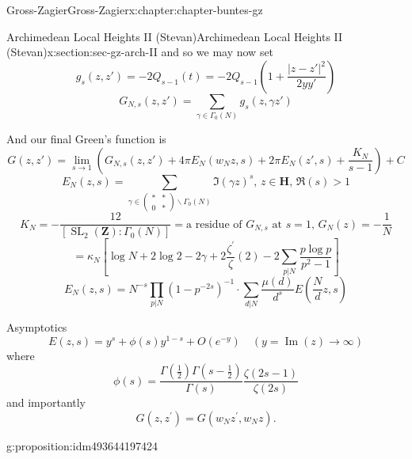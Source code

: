 \documentclass[oneside,10pt,]{book}
\numberwithin{equation}{section}
\newcommand{\lb}{[}
\newcommand{\rb}{]}
\newcommand{\ZZ}{\mathbf{Z}}
\newcommand{\HH}{\mathbf{H}}
\DeclareMathOperator{\SL}{SL}
\newcommand{\gt}{>}
\newcommand{\amp}{&}
\begin{document}
\begin{chapterptx}{Gross-Zagier}{}{Gross-Zagier}{}{}{x:chapter:chapter-buntes-gz}
\begin{sectionptx}{Archimedean Local Heights II (Stevan)}{}{Archimedean Local Heights II (Stevan)}{}{}{x:section:sec-gz-arch-II}
and so we may now set%
\begin{equation*}
g_s(z,z') = -2Q_{s-1}(t) = -2 Q_{s-1}\left(1+ \frac{|z-z'|^2}{2yy'}\right)
\end{equation*}
%
\begin{equation*}
G_{N,s}(z,z') = \sum_{\gamma \in \Gamma _0(N)} g_s(z,\gamma z')
\end{equation*}
%
\par
And our final Green's function is%
\begin{equation*}
G(z,z') = \lim_{s\to 1} (G_{N,s}(z,z') + 4\pi  E_N(w_N z,s) + 2\pi  E_N(z', s)+\frac{K_N}{s-1}) +C
\end{equation*}
%
\begin{equation*}
E_N(z,s) = \sum_{\gamma \in \begin{pmatrix}\ast\amp\ast\\0\amp\ast\end{pmatrix}\backslash \Gamma _0(N)} \Im(\gamma z)^s,\,z\in \HH,\,\Re(s) \gt 1
\end{equation*}
%
\begin{equation*}
K_N = -\frac{12}{\lb \SL_2(\ZZ) : \Gamma _0(N)\rb } = \text{a residue of }G_{N,s} \text{ at } s=1,\,G_N(z) = -\frac{1}{N}
\end{equation*}
%
\begin{equation*}
=\kappa_{N}\left[\log N+2 \log 2-2 \gamma+2 \frac{\zeta^{\prime}}{\zeta}(2)-2 \sum_{p | N} \frac{p \log p}{p^{2}-1}\right]
\end{equation*}
%
\begin{equation*}
E_{N}(z, s)=N^{-s} \prod_{p | N}\left(1-p^{-2 s}\right)^{-1} \cdot \sum_{d | N} \frac{\mu(d)}{d^{s}} E\left(\frac{N}{d} z, s\right)
\end{equation*}
%
\par
Asymptotics%
\begin{equation*}
E(z, s)=y^{s}+\phi(s) y^{1-s}+O\left(e^{-y}\right) \quad(y=\operatorname{Im}(z) \rightarrow \infty)
\end{equation*}
where%
\begin{equation*}
\phi(s)=\frac{\Gamma\left(\frac{1}{2}\right) \Gamma\left(s-\frac{1}{2}\right)}{\Gamma(s)} \frac{\zeta(2 s-1)}{\zeta(2 s)}
\end{equation*}
and importantly%
\begin{equation*}
G\left(z, z^{\prime}\right)=G\left(w_{N} z^{\prime}, w_{N} z\right)\text{.}
\end{equation*}
%
\begin{proposition}{}{}{g:proposition:idm493644197424}%

\end{proposition}
\end{sectionptx}
\end{chapterptx}
\end{document}
